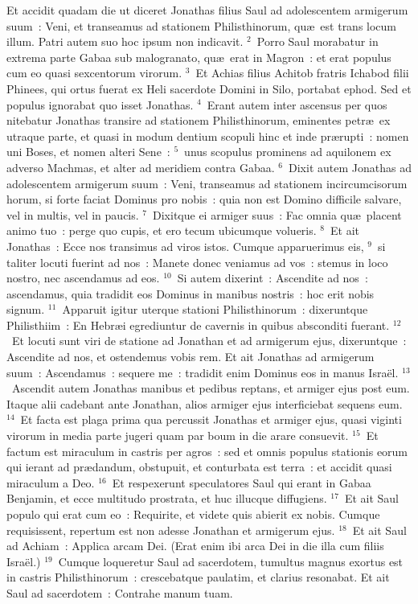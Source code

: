 \lettrine[lines=10,image=true,loversize=0.05,lraise=-0.03]{E}{}t accidit quadam die ut diceret Jonathas filius Saul ad adolescentem armigerum suum~: Veni, et transeamus ad stationem Philisthinorum, qu\ae\ est trans locum illum. Patri autem suo hoc ipsum non indicavit.
${}^{2}$~Porro Saul morabatur in extrema parte Gabaa sub malogranato, qu\ae\ erat in Magron~: et erat populus cum eo quasi sexcentorum virorum.
${}^{3}$~Et Achias filius Achitob fratris Ichabod filii Phinees, qui ortus fuerat ex Heli sacerdote Domini in Silo, portabat ephod. Sed et populus ignorabat quo isset Jonathas.
${}^{4}$~Erant autem inter ascensus per quos nitebatur Jonathas transire ad stationem Philisthinorum, eminentes petr\ae\ ex utraque parte, et quasi in modum dentium scopuli hinc et inde pr\ae rupti~: nomen uni Boses, et nomen alteri Sene~:
${}^{5}$~unus scopulus prominens ad aquilonem ex adverso Machmas, et alter ad meridiem contra Gabaa.
${}^{6}$~Dixit autem Jonathas ad adolescentem armigerum suum~: Veni, transeamus ad stationem incircumcisorum horum, si forte faciat Dominus pro nobis~: quia non est Domino difficile salvare, vel in multis, vel in paucis.
${}^{7}$~Dixitque ei armiger suus~: Fac omnia qu\ae\ placent animo tuo~: perge quo cupis, et ero tecum ubicumque volueris.
${}^{8}$~Et ait Jonathas~: Ecce nos transimus ad viros istos. Cumque apparuerimus eis,
${}^{9}$~si taliter locuti fuerint ad nos~: Manete donec veniamus ad vos~: stemus in loco nostro, nec ascendamus ad eos.
${}^{10}$~Si autem dixerint~: Ascendite ad nos~: ascendamus, quia tradidit eos Dominus in manibus nostris~: hoc erit nobis signum.
${}^{11}$~Apparuit igitur uterque stationi Philisthinorum~: dixeruntque Philisthiim~: En Hebr\ae i egrediuntur de cavernis in quibus absconditi fuerant.
${}^{12}$~Et locuti sunt viri de statione ad Jonathan et ad armigerum ejus, dixeruntque~: Ascendite ad nos, et ostendemus vobis rem. Et ait Jonathas ad armigerum suum~: Ascendamus~: sequere me~: tradidit enim Dominus eos in manus Isra\"el.
${}^{13}$~Ascendit autem Jonathas manibus et pedibus reptans, et armiger ejus post eum. Itaque alii cadebant ante Jonathan, alios armiger ejus interficiebat sequens eum.
${}^{14}$~Et facta est plaga prima qua percussit Jonathas et armiger ejus, quasi viginti virorum in media parte jugeri quam par boum in die arare consuevit.
${}^{15}$~Et factum est miraculum in castris per agros~: sed et omnis populus stationis eorum qui ierant ad pr\ae dandum, obstupuit, et conturbata est terra~: et accidit quasi miraculum a Deo.
${}^{16}$~Et respexerunt speculatores Saul qui erant in Gabaa Benjamin, et ecce multitudo prostrata, et huc illucque diffugiens.
${}^{17}$~Et ait Saul populo qui erat cum eo~: Requirite, et videte quis abierit ex nobis. Cumque requisissent, repertum est non adesse Jonathan et armigerum ejus.
${}^{18}$~Et ait Saul ad Achiam~: Applica arcam Dei. (Erat enim ibi arca Dei in die illa cum filiis Isra\"el.)
${}^{19}$~Cumque loqueretur Saul ad sacerdotem, tumultus magnus exortus est in castris Philisthinorum~: crescebatque paulatim, et clarius resonabat. Et ait Saul ad sacerdotem~: Contrahe manum tuam.


